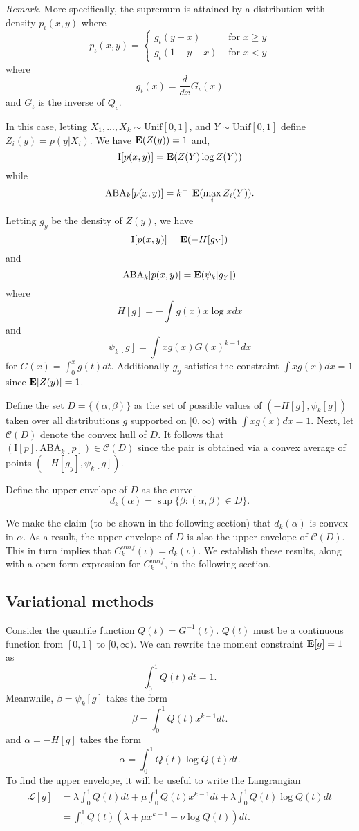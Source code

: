 \documentclass[12pt]{article}
\begin{document}
\emph{Remark.}
More specifically, the supremum is attained by a distribution with
density $p_\iota(x, y)$ where
\[
p_\iota(x, y) = \begin{cases}
g_\iota(y - x) & \text{ for } x\geq y\\
g_\iota(1 + y - x) & \text{ for } x < y
\end{cases}
\]
where
\[
g_\iota(x) = \frac{d}{dx}G_\iota(x)
\]
and $G_\iota$ is the inverse of $Q_c$.



In this case, letting $X_1,...,X_k \sim \text{Unif}[0,1]$, and $Y \sim \text{Unif}[0,1]$ define $Z_i(y) = p(y|X_i)$.
We have $\textbf{E}(Z(y)) = 1$ and,
\[
\text{I}[p(x,y)] = \textbf{E}(Z(Y) \log Z(Y))
\]
while
\[
\text{ABA}_k[p(x,y)] = k^{-1}\textbf{E}(\max_i Z_i(Y)).
\]

Letting $g_y$ be the density of $Z(y)$, we have
\[
\text{I}[p(x,y)] = \textbf{E}(-H[g_Y])
\]
and
\[
\text{ABA}_k[p(x,y)] = \textbf{E}(\psi_k[g_Y])
\]
where
\[
H[g] = -\int g(x) x \log x dx
\]
and
\[
\psi_k[g] = \int x g(x) G(x)^{k-1} dx
\]
for $G(x) = \int_0^x g(t) dt.$
Additionally $g_y$ satisfies the constraint $\int x g(x) dx= 1$ since $\textbf{E}[Z(y)] = 1$.

Define the set $D = \{(\alpha, \beta)\}$ as the set of possible values
of $(-H[g], \psi_k[g])$ taken over all distributions $g$ supported on
$[0,
\infty)$ with $\int x g(x) dx = 1$.  Next, let $\mathcal{C}(D)$ denote the convex hull of $D$.
It follows that $(\text{I}[p], \text{ABA}_k[p]) \in \mathcal{C}(D)$ since the pair is obtained via a convex average of points $(-H[g_y], \psi_k[g])$.

Define the upper envelope of $D$ as the curve
\[
d_k(\alpha) = \sup\{\beta: (\alpha, \beta) \in D\}.
\]

We make the claim (to be shown in the following section) that $d_k(\alpha)$ is convex in $\alpha$.
As a result, the upper envelope of $D$ is also the upper envelope of $\mathcal{C}(D)$.
This in turn implies that $C_k^{unif}(\iota) = d_k(\iota)$.
We establish these results, along with a open-form expression for $C_k^{unif}$, in the following section.

\subsection{Variational methods}

Consider the quantile function $Q(t) = G^{-1}(t).$  $Q(t)$ must be a continuous function from $[0,1]$ to $[0,\infty).$
We can rewrite the moment constraint $\textbf{E}[g]=1$ as
\[
\int_0^1 Q(t) dt = 1.
\]
Meanwhile, $\beta = \psi_k[g]$ takes the form
\[
\beta = \int_0^1 Q(t) x^{k-1} dt.
\]
and $\alpha = -H[g]$ takes the form
\[
\alpha = \int_0^1 Q(t) \log Q(t) dt.
\]
To find the upper envelope, it will be useful to write the Langrangian
\begin{align*}
\mathcal{L}[g] &= \lambda \int_0^1 Q(t) dt + \mu \int_0^1 Q(t) x^{k-1} dt + \lambda \int_0^1 Q(t) \log Q(t) dt
\\&= \int_0^1 Q(t) (\lambda + \mu x^{k-1} + \nu \log Q(t)) dt.
\end{align*}
\end{document}
